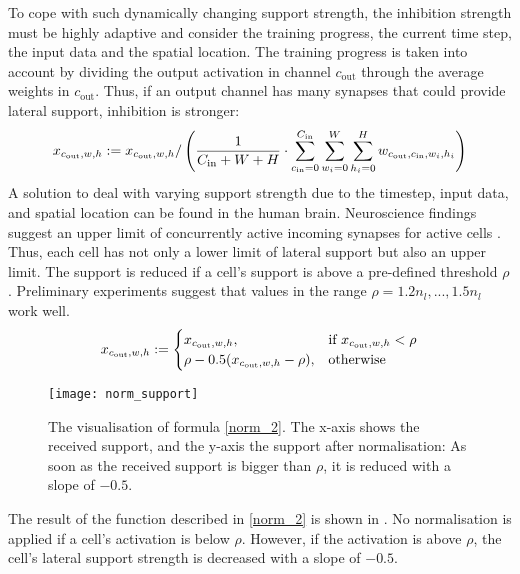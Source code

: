 To cope with such dynamically changing support strength, the inhibition strength must be highly adaptive and consider the training progress, the current time step, the input data and the spatial location. 
The training progress is taken into account by dividing the output activation in channel $c_{\text{out}}$ through the average weights in $c_{\text{out}}$. Thus, if an output channel has many synapses that could provide lateral support, inhibition is stronger:
%
\begin{align}\eqlbl{norm_1}
    x_{c_{\text{out}},w,h} := x_{c_{\text{out}},w,h} / \left( \frac{1}{C_{\text{in}} + W + H} \cdot \sum_{c_{\text{in}}=0}^{C_{\text{in}}} \sum_{w_i=0}^{W} \sum_{h_i=0}^{H} w_{c_{\text{out}}, c_{\text{in}},w_i,h_i}  \right)
\end{align}
%
A solution to deal with varying support strength due to the timestep, input data, and spatial location can be found in the human brain.
Neuroscience findings suggest an upper limit of concurrently active incoming synapses for active cells . Thus, each cell has not only a lower limit of lateral support but also an upper limit.
The support is reduced if a cell's support is above a pre-defined threshold $\rho$.
Preliminary experiments suggest that values in the range $\rho = 1.2n_l, ..., 1.5n_l$ work well.
%
\begin{align}\eqlbl{norm_2}
	x_{c_{\text{out}},w,h} := \begin{cases}
      		x_{c_{\text{out}},w,h}, & \text{if } x_{c_{\text{out}},w,h} < \rho \\
      		\rho - 0.5(x_{c_{\text{out}},w,h} - \rho), & \text{otherwise}
    	\end{cases}
\end{align}
%
\begin{figure}[h]
    \centering
    \texttt{[image: norm\_support]}
    \caption[Inhibition for too many activated cells]{The visualisation of formula \eqref{norm_2}. The x-axis shows the received support, and the y-axis the support after normalisation: As soon as the received support is bigger than $\rho$, it is reduced with a slope of $-0.5$.}
\end{figure}
The result of the function described in \eqref{norm_2} is shown in . No normalisation is applied if a cell's activation is below $\rho$. However, if the activation is above $\rho$, the cell's lateral support strength is decreased with a slope of $-0.5$.



